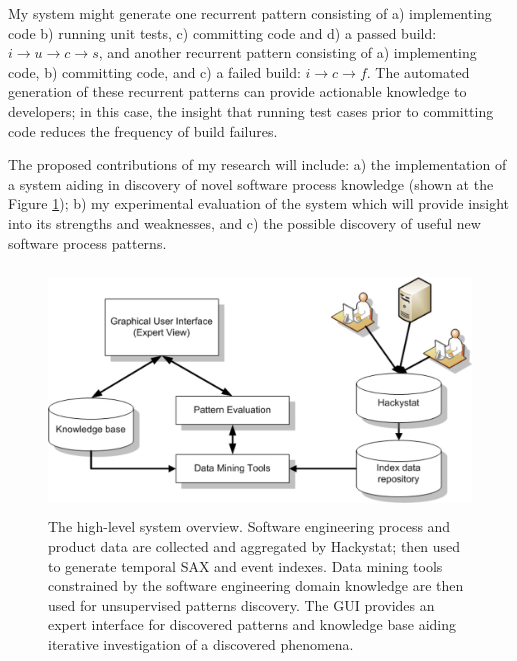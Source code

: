 \documentclass[11pt,oneside]{article}
\begin{document}
My system might generate one recurrent pattern consisting of a) implementing code b) running unit tests, c) committing code and d) a passed build: $i \rightarrow u \rightarrow c \rightarrow s $, and another recurrent pattern consisting of a) implementing code, b) committing code, and c) a failed build: $i \rightarrow c \rightarrow f $. The automated generation of these recurrent patterns can provide actionable knowledge to developers; in this case, the insight that running test cases prior to committing code reduces the frequency of build failures.

The proposed contributions of my research will include: a) the implementation of a system aiding in discovery of novel software process knowledge (shown at the Figure \ref{fig:system_overview}); b) my experimental evaluation of the system which will provide insight into its strengths and weaknesses, and c) the possible discovery of useful new software process patterns.
\begin{figure}[tbp]
   \centering
   \includegraphics[height=65mm]{system_overview.eps}
   \caption{The high-level system overview. Software engineering process and product data are collected and aggregated by Hackystat; then used to generate temporal SAX and event indexes. Data mining tools constrained by the software engineering domain knowledge are then used for unsupervised patterns discovery. The GUI provides an expert interface for discovered patterns and knowledge base aiding iterative investigation of a discovered phenomena.}
   \label{fig:system_overview}
\end{figure}
\end{document}
